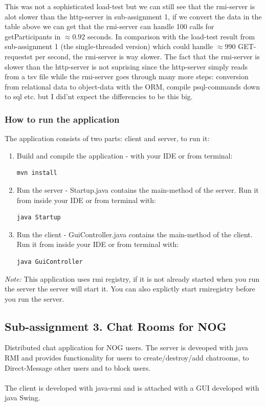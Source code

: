 \documentclass[a4paper, 11pt]{article}
\begin{document}
This was not a sophisticated load-test but we can still see that the rmi-server is alot slower than the http-server in sub-assignment 1, if we convert the data in the table above we can get that the rmi-server can handle 100 calls for getParticipants in $\approx 0.92$ seconds. In comparison with the load-test result from sub-assignment 1 (the single-threaded version) which could handle $\approx 990$ GET-requestst per second, the rmi-server is way slower. The fact that the rmi-server is slower than the http-server is not suprising since the http-server simply reads from a tsv file while the rmi-server goes through many more steps: conversion from relational data to object-data with the ORM, compile psql-commands down to sql etc. but I did'nt expect the differencies to be this big.
\subsubsection{How to run the application}
The application consists of two parts: client and server, to run it:
\begin{enumerate}
\item Build and compile the application - with your IDE or from terminal:
\begin{verbatim}
mvn install
\end{verbatim}
\item Run the server - Startup.java contains the main-method of the server. Run it from inside your IDE or from terminal with: 
\begin{verbatim}
java Startup
\end{verbatim}
\item Run the client - GuiController.java contains the main-method of the client. Run it from inside your IDE or from terminal with: 
\begin{verbatim}
java GuiController
\end{verbatim}
\end{enumerate}
\textit{Note:} This application uses rmi registry, if it is not already started when you run the server the server will start it. You can also explictly start rmiregistry before you run the server.
\subsection{Sub-assignment 3. Chat Rooms for NOG}
Distributed chat application for NOG users.
The server is deveoped with java RMI and provides functionality for users to create/destroy/add chatrooms, to Direct-Message other users and to block users.
\\ \\The client is developed with java-rmi and is attached with a GUI developed with java Swing.
\end{document}

